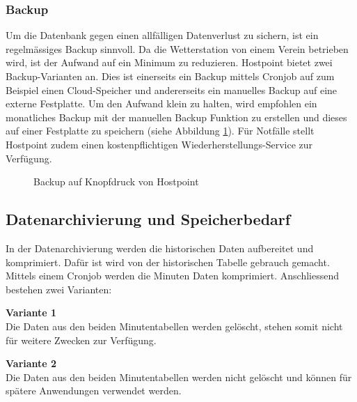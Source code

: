 \subsubsection{Backup}
Um die Datenbank gegen einen allfälligen Datenverlust zu sichern, ist ein regelmässiges Backup sinnvoll. Da die Wetterstation von einem Verein betrieben wird, ist der Aufwand auf ein Minimum zu reduzieren. Hostpoint bietet zwei Backup-Varianten an. Dies ist einerseits ein Backup mittels Cronjob auf zum Beispiel einen Cloud-Speicher und andererseits ein manuelles Backup auf eine externe Festplatte. Um den Aufwand klein zu halten, wird empfohlen ein monatliches Backup mit der manuellen Backup Funktion zu erstellen und dieses auf einer Festplatte zu speichern (siehe Abbildung \ref{img:backup}). Für Notfälle stellt Hostpoint zudem einen kostenpflichtigen Wiederherstellungs-Service zur Verfügung.

\begin{figure}[htbp!]
	\centering
	\caption{Backup auf Knopfdruck von Hostpoint}
	\label{img:backup}
\end{figure}


\subsection{Datenarchivierung und Speicherbedarf}
In der Datenarchivierung werden die historischen Daten aufbereitet und komprimiert. Dafür ist wird von der historischen Tabelle gebrauch gemacht. Mittels einem Cronjob werden die Minuten Daten komprimiert. Anschliessend bestehen zwei Varianten:

\begin{itemize*}
\item \textbf{Variante 1}\\
Die Daten aus den beiden Minutentabellen werden gelöscht, stehen somit nicht für weitere Zwecken zur Verfügung.
\item \textbf{Variante 2}\\
Die Daten aus den beiden Minutentabellen werden nicht gelöscht und können für spätere Anwendungen verwendet werden.
\end{itemize*}

